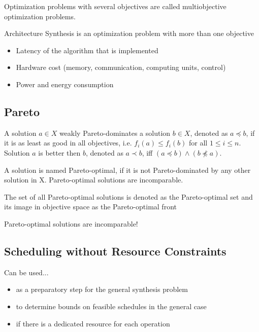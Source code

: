 \begin{definition}
Optimization problems with several objectives are called multiobjective optimization problems.
\end{definition}

Architecture Synthesis is an optimization problem with more than one objective
\begin{itemize}[noitemsep]
\item Latency of the algorithm that is implemented
\item Hardware cost (memory, communication, computing units, control)
\item Power and energy consumption
\end{itemize}


\subsection{Pareto}
\begin{definition}
A solution $a \in X$ weakly Pareto-dominates a solution $b \in X$, denoted as $a \preceq b$, if it is as least as good in all objectives, i.e. $f_i(a) \leq f_i(b)$ for all $1 \leq i \leq n$. Solution $a$ is better then $b$, denoted as $a \prec b$, iff $(a \preceq b) \land (b \npreceq a)$.
\end{definition}

\begin{definition}
A solution is named Pareto-optimal, if it is not Pareto-dominated by any other solution in X. Pareto-optimal solutions are incomparable.
\end{definition}

\begin{definition}
The set of all Pareto-optimal solutions is denoted as the Pareto-optimal set and its image in objective space as the Pareto-optimal front
\end{definition}

\begin{tnote}
Pareto-optimal solutions are incomparable!
\end{tnote}

\subsection{Scheduling without Resource Constraints}
Can be used...
\begin{itemize}[noitemsep]
\item as a preparatory step for the general synthesis problem
\item to determine bounds on feasible schedules in the general case
\item if there is a dedicated resource for each operation
\end{itemize}


